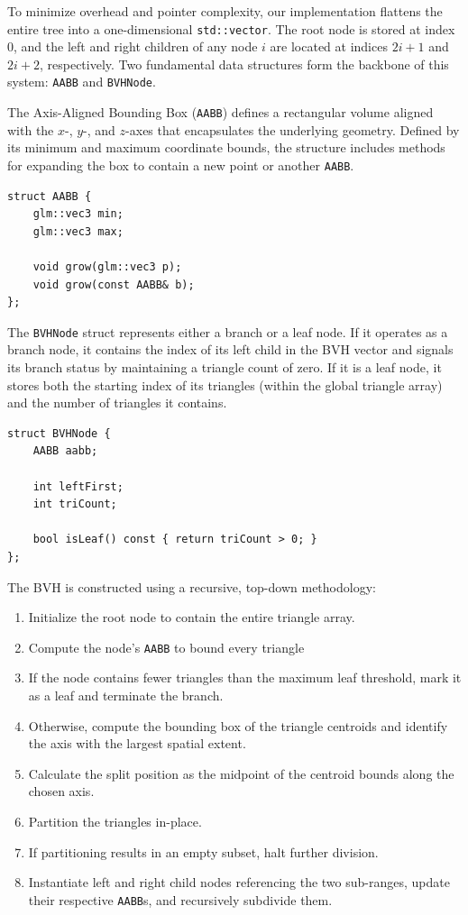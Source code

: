 \documentclass[sigconf,nonacm]{acmart}
\begin{document}
To minimize overhead and pointer complexity, our implementation flattens the entire tree into a one-dimensional \texttt{std::vector}. The root node is stored at index $0$, and the left and right children of any node $i$ are located at indices $2i+1$ and $2i+2$, respectively. Two fundamental data structures form the backbone of this system: \texttt{AABB} and \texttt{BVHNode}.

The Axis-Aligned Bounding Box (\texttt{AABB}) defines a rectangular volume aligned with the $x$-, $y$-, and $z$-axes that encapsulates the underlying geometry. Defined by its minimum and maximum coordinate bounds, the structure includes methods for expanding the box to contain a new point or another \texttt{AABB}.

\begin{lstlisting}[style=cppstyle]
struct AABB {
    glm::vec3 min;
    glm::vec3 max;

    void grow(glm::vec3 p);
    void grow(const AABB& b);
};
\end{lstlisting}

The \texttt{BVHNode} struct represents either a branch or a leaf node. If it operates as a branch node, it contains the index of its left child in the BVH vector and signals its branch status by maintaining a triangle count of zero. If it is a leaf node, it stores both the starting index of its triangles (within the global triangle array) and the number of triangles it contains.

\begin{lstlisting}[style=cppstyle]
struct BVHNode {
    AABB aabb;

    int leftFirst;
    int triCount;

    bool isLeaf() const { return triCount > 0; }
};
\end{lstlisting}

The BVH is constructed using a recursive, top-down methodology:
\begin{enumerate}
    \item Initialize the root node to contain the entire triangle array.
    \item Compute the node's \texttt{AABB} to bound every triangle
    \item If the node contains fewer triangles than the maximum leaf threshold, mark it as a leaf and terminate the branch.
    \item Otherwise, compute the bounding box of the triangle centroids and identify the axis with the largest spatial extent.
    \item Calculate the split position as the midpoint of the centroid bounds along the chosen axis.
    \item Partition the triangles in-place.
    \item If partitioning results in an empty subset, halt further division.
    \item Instantiate left and right child nodes referencing the two sub-ranges, update their respective \texttt{AABB}s, and recursively subdivide them.
\end{enumerate}
\end{document}
